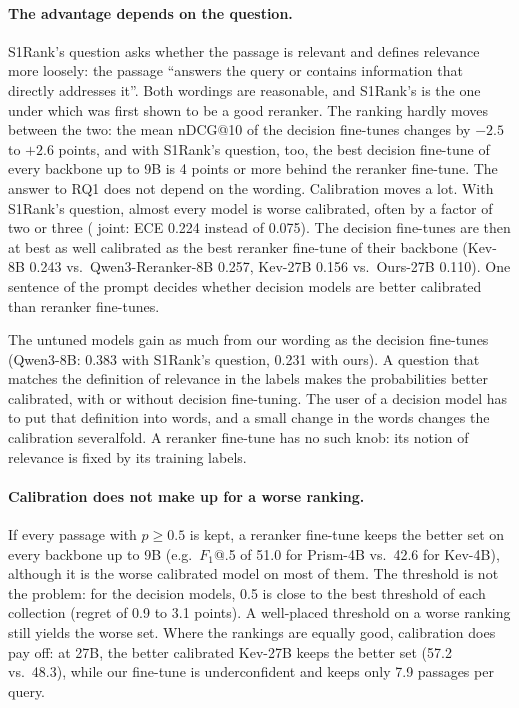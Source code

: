 \paragraph{The advantage depends on the question.}
S1Rank's question asks whether the passage is relevant and defines relevance more loosely: the passage ``answers the
query or contains information that directly addresses it''. Both wordings are reasonable, and S1Rank's is the one
under which \jev{} was first shown to be a good reranker. The ranking hardly moves between the two: the mean nDCG@10
of the decision fine-tunes changes by $-2.5$ to $+2.6$ points, and with S1Rank's question, too, the best decision
fine-tune of every backbone up to 9B is 4 points or more behind the reranker fine-tune. The answer to RQ1 does not
depend on the wording. Calibration moves a lot. With S1Rank's question, almost every model is worse calibrated, often
by a factor of two or three (\jev{} joint: ECE 0.224 instead of 0.075). The decision fine-tunes are then at best as
well calibrated as the best reranker fine-tune of their backbone (Kev-8B 0.243 vs.\ Qwen3-Reranker-8B 0.257, Kev-27B
0.156 vs.\ Ours-27B 0.110). One sentence of the prompt decides whether decision models are better calibrated than
reranker fine-tunes.

The untuned models gain as much from our wording as the decision fine-tunes (Qwen3-8B: 0.383 with S1Rank's question,
0.231 with ours). A question that matches the definition of relevance in the labels makes the probabilities better
calibrated, with or without decision fine-tuning. The user of a decision model has to put that definition into words,
and a small change in the words changes the calibration severalfold. A reranker fine-tune has no such knob: its
notion of relevance is fixed by its training labels.

\paragraph{Calibration does not make up for a worse ranking.}
If every passage with $p \ge 0.5$ is kept, a reranker fine-tune keeps the better set on every backbone up to 9B
(e.g.\ $F_1$@.5 of 51.0 for Prism-4B vs.\ 42.6 for Kev-4B), although it is the worse calibrated model on most of
them. The threshold is not the problem: for the decision models, 0.5 is close to the best threshold of each
collection (regret of 0.9 to 3.1 points). A well-placed threshold on a worse ranking still yields the worse set. Where
the rankings are equally good, calibration does pay off: at 27B, the better calibrated Kev-27B keeps the better set
(57.2 vs.\ 48.3), while our fine-tune is underconfident and keeps only 7.9 passages per query.

